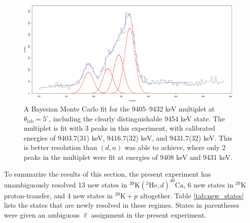\begin{figure}[t]
\centering
\includegraphics[width=6.5in]{Chapter-6/figs/5deg_9400keVGroup.png}
\caption{\label{fig:5deg_9400keVGroup}A Bayesian Monte Carlo fit for the 9405--9432 keV multiplet at $\theta_{\mathrm{lab}} = 5^{\circ}$, including the clearly distinguishable 9454 keV state. The multiplet is fit with 3 peaks in this experiment, with calibrated energies of 9403.7(31) keV, 9416.7(32) keV, and 9431.7(32) keV. This is better resolution than $(d,n)$ \cite{Fuchs1969} was able to achieve, where only 2 peaks in the multiplet were fit at energies of 9408 keV and 9431 keV.}
\end{figure}

To summarize the results of this section, the present experiment has unambiguously resolved 13 new states in $^{39}\mathrm{K}(^{3}\mathrm{He},d)^{40}\mathrm{Ca}$, 6 new states in $^{39}$K proton-transfer, and 4 new states in $^{39}\mathrm{K}+p$ altogether. Table \ref{tab:new_states} lists the states that are newly resolved in these regimes. States in parentheses were given an ambiguous $\ell$ assignment in the present experiment.

